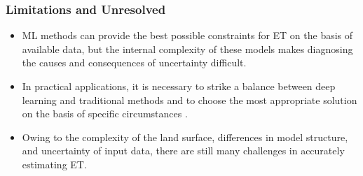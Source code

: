 \documentclass[paper=a4, fontsize=12pt]{scrartcl}
\begin{document}
	
	
	\subsubsection{Limitations and Unresolved}
	\begin{itemize}
		\item ML methods can provide the best possible constraints for ET on the basis of available data, but the internal complexity of these models makes diagnosing the causes and consequences of uncertainty difficult.
		\item In practical applications, it is necessary to strike a balance between deep learning and traditional methods and to choose the most appropriate solution on the basis of specific circumstances \citep{amani2023review}.
		\item Owing to the complexity of the land surface, differences in model structure, and uncertainty of input data, there are still many challenges in accurately estimating ET.
	\end{itemize}
	
	
\end{document}
